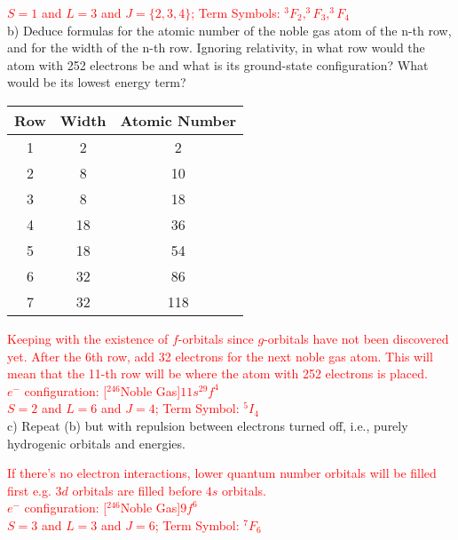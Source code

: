 \documentclass{article}
\begin{document}
\textcolor{red}{$S=1$ and $L=3$ and $J=\{2,3,4\}$;
  Term Symbols: $^3F_2, ^3F_3, ^3F_4$}
\\

\noindent b) Deduce formulas for the atomic number of the noble gas
atom of the n-th row, and for the width of the n-th row. Ignoring relativity,
in what row would the atom with 252 electrons be and what is its
ground-state configuration? What would be its lowest energy term?

\begin{table}[hbpt]
  \center
  \begin{tabular}{ccc}
    Row & Width & Atomic Number \\
    \hline
    1 & 2 & 2 \\
    2 & 8 & 10 \\
    3 & 8 & 18 \\
    4 & 18& 36 \\
    5 & 18& 54 \\
    6 & 32& 86 \\
    7 & 32& 118
  \end{tabular}
\end{table}

\textcolor{red}{Keeping with the existence of $f$-orbitals since
  $g$-orbitals have not been discovered yet. After the 6th row,
  add 32 electrons for the next noble gas atom. This will mean that the
  11-th row will be where the atom with 252 electrons is placed.}
\\

\noindent\textcolor{red}{$e^-$ configuration: [$^{246}$Noble Gas]$11s^29f^4$
  \\
  $S=2$ and $L=6$ and $J=4$; Term Symbol: $^5I_4$}
\\

\noindent c) Repeat (b) but with repulsion between electrons turned off,
i.e., purely hydrogenic orbitals and energies.

\textcolor{red}{If there's no electron interactions, lower quantum
  number orbitals will be filled first e.g. $3d$ orbitals are filled before
  $4s$ orbitals.}
\\

\noindent\textcolor{red}{$e^-$ configuration: [$^{246}$Noble Gas]$9f^6$
  \\
  $S=3$ and $L=3$ and $J=6$; Term Symbol: $^7F_6$}
\end{document}
